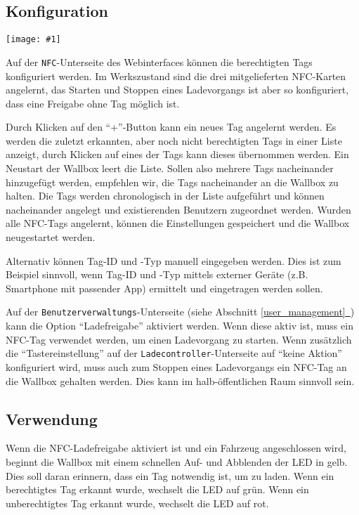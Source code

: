 \documentclass[a4paper,10pt]{article}
\newcommand{\gfx}[1]{\texttt{[image: \#1]}}
\newcommand*{\fullref}[1]{Abschnitt \hyperref[{#1}]{\ref*{#1}~\nameref*{#1}}}
\begin{document}
\begin{multicols*}{2}
    \subsection{Konfiguration}
    \gfx{./img_warp3/resized/web_nfc}

    Auf der \texttt{NFC}-Unterseite des Webinterfaces können die berechtigten Tags konfiguriert werden.
    Im Werkszustand sind die drei mitgelieferten NFC-Karten angelernt,
    das Starten und Stoppen eines Ladevorgangs ist aber so konfiguriert, dass eine
    Freigabe ohne Tag möglich ist.

    Durch Klicken auf den \enquote{+}-Button kann ein neues Tag angelernt werden.
    Es werden die zuletzt erkannten, aber noch nicht berechtigten Tags in einer
    Liste anzeigt, durch Klicken auf eines der Tags kann dieses übernommen werden. Ein Neustart der
    Wallbox leert die Liste. Sollen also mehrere Tags nacheinander hinzugefügt
    werden, empfehlen wir, die Tags nacheinander an die Wallbox zu halten. Die
    Tags werden chronologisch in der Liste aufgeführt und können
    nacheinander angelegt und existierenden Benutzern zugeordnet
    werden. Wurden alle NFC-Tags angelernt, können die Einstellungen gespeichert und die
    Wallbox neugestartet werden.

    Alternativ können Tag-ID und -Typ manuell eingegeben werden. Dies ist zum Beispiel sinnvoll,
    wenn Tag-ID und -Typ mittels externer Geräte (z.B. Smartphone mit passender
    App) ermittelt und eingetragen werden sollen.

    Auf der \texttt{Benutzerverwaltungs}-Unterseite (siehe \fullref{user_management}) kann die Option \enquote{Ladefreigabe} aktiviert werden.
    Wenn diese aktiv ist, muss ein NFC-Tag verwendet werden, um einen Ladevorgang zu starten.
    Wenn zusätzlich die \enquote{Tastereinstellung} auf der \texttt{Ladecontroller}-Unterseite auf \enquote{keine Aktion} konfiguriert wird,
    muss auch zum Stoppen eines Ladevorgangs ein NFC-Tag an die Wallbox gehalten werden. Dies kann im
    halb-öffentlichen Raum sinnvoll sein.

    \subsection{Verwendung}
    Wenn die NFC-Ladefreigabe aktiviert ist und ein Fahrzeug angeschlossen wird,
    beginnt die Wallbox mit einem schnellen Auf- und Abblenden der LED in gelb.
    Dies soll daran erinnern, dass ein Tag notwendig ist, um zu laden.
    Wenn ein berechtigtes Tag erkannt wurde, wechselt die LED auf grün.
    Wenn ein unberechtigtes Tag erkannt wurde, wechselt die LED auf rot.


\end{multicols*}
\end{document}
